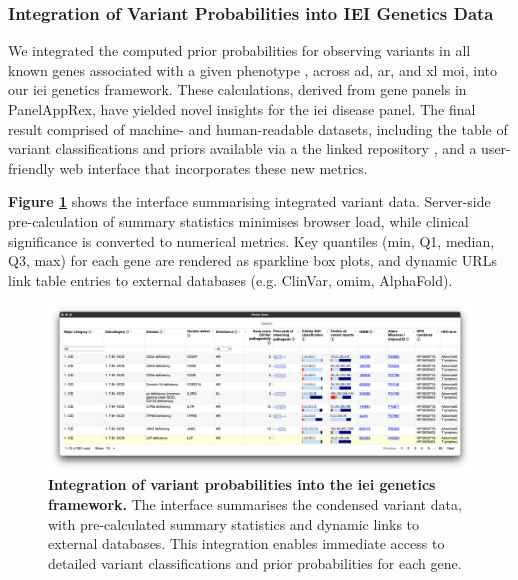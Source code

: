 \FloatBarrier
\subsubsection{Integration of Variant Probabilities into IEI Genetics Data}
We integrated the computed prior probabilities for observing variants in all known genes associated with a given phenotype \cite{tangye_human_2022}, across \ac{ad}, \ac{ar}, and \ac{xl} \ac{moi}, into our \ac{iei} genetics framework. These calculations, derived from gene panels in PanelAppRex, have yielded novel insights for the \ac{iei} disease panel. The final result comprised of machine- and human-readable datasets, including the table of variant classifications and priors available via a the linked repository \cite{lawless_2025_15111584}, and a user-friendly web interface that incorporates these new metrics.

\textbf{Figure \ref{fig:var_risk_est_iei_genetics}} shows the interface summarising integrated variant data. Server-side pre-calculation of summary statistics minimises browser load, while clinical significance is converted to numerical metrics. Key quantiles (min, Q1, median, Q3, max) for each gene are rendered as sparkline box plots, and dynamic URLs link table entries to external databases (e.g. ClinVar, \ac{omim}, AlphaFold).

\begin{figure}[ht]
  \centering
  \includegraphics[width=1\textwidth]{../images/var_risk_est_iei_genetics.png}
  \caption{
    \textbf{Integration of variant probabilities into the \ac{iei} genetics framework.}
    The interface summarises the condensed variant data, with pre-calculated summary statistics and dynamic links to external databases. This integration enables immediate access to detailed variant classifications and prior probabilities for each gene.
  }
  \label{fig:var_risk_est_iei_genetics}
\end{figure}

